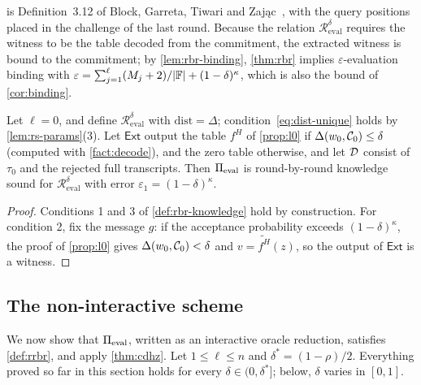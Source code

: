 \begin{remark}\label{rem:bgtz}
 is Definition~3.12 of Block, Garreta, Tiwari and Zaj\k{a}c~\cite{BGTZ24}, with the query positions placed in the challenge of the last round.
Because the relation $\mathcal{R}^{\delta}_{\mathrm{eval}}$ requires the witness to be the table decoded from the commitment, the extracted witness is bound to the commitment; by \cref{lem:rbr-binding}, \cref{thm:rbr} implies $\varepsilon$-evaluation binding with $\varepsilon = \sum_{j=1}^{\ell}(M_j+2)/|\mathbb{F}| + (1-\delta)^\kappa$, which is also the bound of \cref{cor:binding}.
\end{remark}

\begin{proposition}[Round-by-round knowledge soundness for $\ell = 0$]\label{prop:rbr-l0}
Let $\ell = 0$, and define $\mathcal{R}^{\delta}_{\mathrm{eval}}$ with $\mathrm{dist} = \Delta$; condition~\eqref{eq:dist-unique} holds by \cref{lem:rs-params}(3).
Let $\mathsf{Ext}$ output the table $f^H$ of \cref{prop:l0} if $\Delta(w_0, \mathcal{C}_0) \le \delta$ (computed with \cref{fact:decode}), and the zero table otherwise, and let $\mathcal{D}$ consist of $\tau_0$ and the rejected full transcripts.
Then $\Pi_{\mathrm{eval}}$ is round-by-round knowledge sound for $\mathcal{R}^{\delta}_{\mathrm{eval}}$ with error $\varepsilon_1 = (1-\delta)^\kappa$.
\end{proposition}

\begin{proof}
Conditions 1 and 3 of \cref{def:rbr-knowledge} hold by construction. For condition 2, fix the message $g$: if the acceptance probability exceeds $(1-\delta)^\kappa$, the proof of \cref{prop:l0} gives $\Delta(w_0, \mathcal{C}_0) < \delta$ and $v = \tilde{f^H}(z)$, so the output of $\mathsf{Ext}$ is a witness.
\end{proof}

\subsection{The non-interactive scheme}\label{sec:sound:pq}

We now show that $\Pi_{\mathrm{eval}}$, written as an interactive oracle reduction, satisfies \cref{def:rrbr}, and apply \cref{thm:cdhz}.
Let $1 \le \ell \le n$ and $\delta^* = (1-\rho)/2$.
Everything proved so far in this section holds for every $\delta \in (0, \delta^*]$; below, $\delta$ varies in $[0,1]$.

